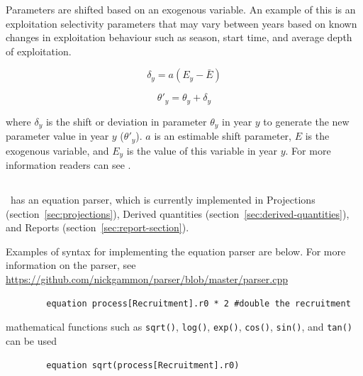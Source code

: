 \subsubsection[Exogenous]{}

Parameters are shifted based on an exogenous variable. An example of this is an exploitation selectivity parameters that may vary between years based on known changes in exploitation behaviour such as season, start time, and average depth of exploitation.

\begin{equation}
\delta_y = a(E_y - \bar{E})
\end{equation}

\begin{equation}
\theta'_y = \theta_y + \delta_y
\end{equation}

where $\delta_y$ is the shift or deviation in parameter $\theta_y$ in year $y$ to generate the new parameter value in year $y$ ($\theta'_y$). $a$ is an estimable shift parameter, $E$ is the exogenous variable, and $E_y$ is the value of this variable in year $y$. For more information readers can see \cite{francis_03}.

\subsection{\label{sec:eq_parser}}

\CNAME~has an equation parser, which is currently implemented in Projections (section~\ref{sec:projections}), Derived quantities (section~\ref{sec:derived-quantities}), and Reports (section~\ref{sec:report-section}).

Examples of syntax for implementing the equation parser are below. For more information on the parser, see \url{https://github.com/nickgammon/parser/blob/master/parser.cpp}


{\small{\begin{verbatim}
		equation process[Recruitment].r0 * 2 #double the recruitment
\end{verbatim}}}

mathematical functions such as \texttt{sqrt()}, \texttt{log()},  \texttt{exp()},  \texttt{cos()}, \texttt{sin()}, and \texttt{tan()} can be used

{\small{\begin{verbatim}
		equation sqrt(process[Recruitment].r0)
\end{verbatim}}}

